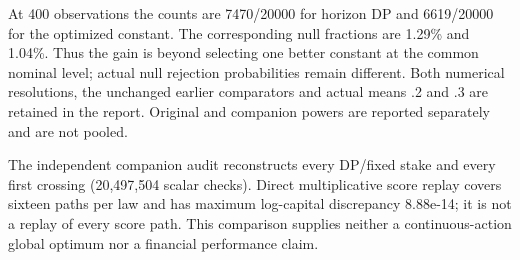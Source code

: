 At 400 observations the counts are 7470/20000 for horizon DP and 6619/20000 for the optimized constant. The corresponding null fractions are 1.29\% and 1.04\%. Thus the gain is beyond selecting one better constant at the common nominal level; actual null rejection probabilities remain different. Both numerical resolutions, the unchanged earlier comparators and actual means .2 and .3 are retained in the report. Original and companion powers are reported separately and are not pooled.

The independent companion audit reconstructs every DP/fixed stake and every first crossing (20,497,504 scalar checks). Direct multiplicative score replay covers sixteen paths per law and has maximum log-capital discrepancy 8.88e-14; it is not a replay of every score path. This comparison supplies neither a continuous-action global optimum nor a financial performance claim.
